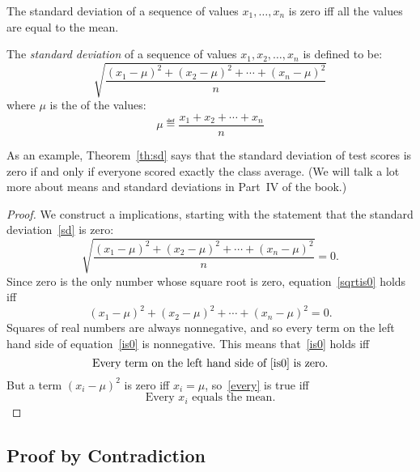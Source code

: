 \begin{theorem}\label{th:sd}
The standard deviation of a sequence of values $x_1, \dots, x_n$ is
zero iff all the values are equal to the mean.
\end{theorem}

\begin{definition*}
The \textit{standard deviation} of a sequence of values $x_1, x_2,
\dots, x_n$ is defined to be:
%
\begin{equation}\label{sd}
\sqrt{\frac{(x_1 - \mu)^2 + (x_2 - \mu)^2 + \cdots + (x_n - \mu)^2}{n}}
\end{equation}
%
where $\mu$ is the  of the values:
%
\[
\mu \eqdef \frac{x_1 + x_2 + \cdots + x_n}{n}
\]
\end{definition*}

As an example, Theorem~\ref{th:sd} says that the standard deviation of
test scores is zero if and only if everyone scored exactly the class
average.  (We will talk a lot more about means and standard deviations
in Part~IV of the book.)

\begin{proof}
We construct a  implications, starting with the
statement that the standard deviation~\eqref{sd} is zero:
%
\begin{equation}\label{sqrtis0}
\sqrt{\frac{(x_1 - \mu)^2 + (x_2 - \mu)^2 + \cdots + (x_n - \mu)^2}{n}} = 0.
\end{equation}
%
Since zero is the only number whose square root is zero,
equation~\eqref{sqrtis0} holds iff
\begin{equation}\label{is0}
(x_1 - \mu)^2 + (x_2 - \mu)^2 + \cdots + (x_n - \mu)^2 = 0.
\end{equation}
Squares of real numbers are always nonnegative, and so every term on the
left hand side of equation~\eqref{is0} is nonnegative.  This means
that~\eqref{is0} holds iff
\begin{equation}\label{every}
\text{Every term on the left hand side of~\eqref{is0} is zero.}
\end{equation}
But a term $(x_i - \mu)^2$ is zero iff $x_i=\mu$, so~\eqref{every} is true
iff
\[
\text{Every $x_i$ equals the mean.}
\]

\end{proof}


\subsection{Proof by Contradiction}\label{contradiction}

